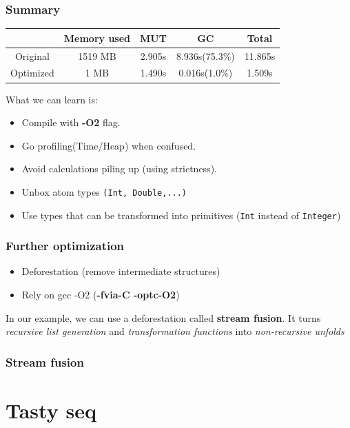 \documentclass{beamer}
\newcommand{\inlinehaskell}[1]{\texttt{#1}}
\newcommand{\inlineshell}[1]{\textcolor{shellcolor}{\textbf{#1}}}
\begin{document}
\begin{frame}
\frametitle{Summary}
\begin{tabular}{ccccc}
\hline
    &  Memory used  &   MUT  &      GC        & Total\\
\hline
Original  & 1519 MB & 2.905s & 8.936s(75.3\%) & 11.865s\\
Optimized &   1 MB  & 1.490s & 0.016s(1.0\%) &  1.509s\\
\hline
\end{tabular}
\newline\newline
What we can learn is:
\begin{itemize}
    \item Compile with \inlineshell{-O2} flag.
    \item Go profiling(Time/Heap) when confused.
    \item Avoid calculations piling up (using strictness).
    \item Unbox atom types \inlinehaskell{(Int, Double,...)}
    \item Use types that can be transformed into primitives (\inlinehaskell{Int} instead of \inlinehaskell{Integer})
\end{itemize}
\end{frame}


\begin{frame}
\frametitle{Further optimization}
\begin{itemize}
    \item Deforestation (remove intermediate structures)
    \item Rely on gcc -O2 (\inlineshell{-fvia-C -optc-O2})
\end{itemize}
\bigskip
In our example, we can use a deforestation called \textbf{stream fusion}.\newline
It turns \textit{recursive list generation} and \textit{transformation functions} into \textit{non-recursive unfolds}
\end{frame}

\begin{frame}
\frametitle{Stream fusion}
\end{frame}


\section{Tasty seq}
\end{document}
